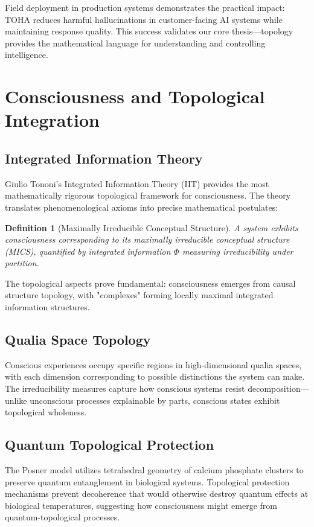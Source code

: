 \documentclass[11pt]{article}
\newtheorem{definition}[theorem]{Definition}
\begin{document}
Field deployment in production systems demonstrates the practical impact: TOHA reduces harmful hallucinations in customer-facing AI systems while maintaining response quality. This success validates our core thesis—topology provides the mathematical language for understanding and controlling intelligence.

\section{Consciousness and Topological Integration}

\subsection{Integrated Information Theory}

Giulio Tononi's Integrated Information Theory (IIT) provides the most mathematically rigorous topological framework for consciousness. The theory translates phenomenological axioms into precise mathematical postulates:

\begin{definition}[Maximally Irreducible Conceptual Structure]
A system exhibits consciousness corresponding to its \emph{maximally irreducible conceptual structure} (MICS), quantified by integrated information $\Phi$ measuring irreducibility under partition.
\end{definition}

The topological aspects prove fundamental: consciousness emerges from causal structure topology, with "complexes" forming locally maximal integrated information structures.

\subsection{Qualia Space Topology}

Conscious experiences occupy specific regions in high-dimensional qualia spaces, with each dimension corresponding to possible distinctions the system can make. The irreducibility measures capture how conscious systems resist decomposition—unlike unconscious processes explainable by parts, conscious states exhibit topological wholeness.

\subsection{Quantum Topological Protection}

The Posner model utilizes tetrahedral geometry of calcium phosphate clusters to preserve quantum entanglement in biological systems. Topological protection mechanisms prevent decoherence that would otherwise destroy quantum effects at biological temperatures, suggesting how consciousness might emerge from quantum-topological processes.
\end{document}
